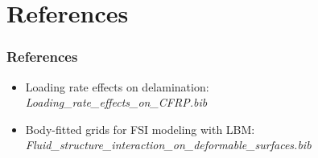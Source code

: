 \documentclass[first,firstsupp,lastsupp,handout,last,hyperref,table]{ETHclass}
\begin{document}
\section{References}

\begin{frame}[t,label=references,allowframebreaks]
       \frametitle{References}
	\begin{itemize}
	\item Loading rate effects on delamination:\\[10pt] \textit{Loading\_rate\_effects\_on\_CFRP.bib}\\[30pt]
	\item Body-fitted grids for FSI modeling with LBM:\\[10pt] \textit{Fluid\_structure\_interaction\_on\_deformable\_surfaces.bib}
	\end{itemize}
%        
%          
\end{frame}

\begin{frame}[plain]
\frametitle{}
\end{frame}
\end{document}
